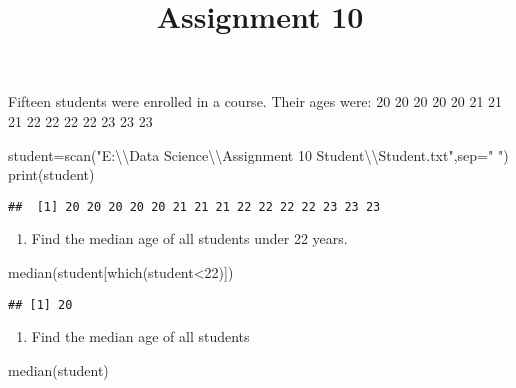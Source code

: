 \documentclass[
]{article}
\title{Assignment 10}
\author{}
\date{\vspace{-2.5em}}
\newenvironment{Shaded}{\begin{snugshade}}{\end{snugshade}}
\newcommand{\AttributeTok}[1]{\textcolor[rgb]{0.77,0.63,0.00}{#1}}
\newcommand{\DecValTok}[1]{\textcolor[rgb]{0.00,0.00,0.81}{#1}}
\newcommand{\FunctionTok}[1]{\textcolor[rgb]{0.00,0.00,0.00}{#1}}
\newcommand{\NormalTok}[1]{#1}
\newcommand{\OtherTok}[1]{\textcolor[rgb]{0.56,0.35,0.01}{#1}}
\newcommand{\SpecialCharTok}[1]{\textcolor[rgb]{0.00,0.00,0.00}{#1}}
\newcommand{\StringTok}[1]{\textcolor[rgb]{0.31,0.60,0.02}{#1}}
\providecommand{\tightlist}{%
  \setlength{\itemsep}{0pt}\setlength{\parskip}{0pt}}
\begin{document}
\maketitle

Fifteen students were enrolled in a course. Their ages were: 20 20 20 20
20 21 21 21 22 22 22 22 23 23 23

\begin{Shaded}
\begin{Highlighting}[]
\NormalTok{student}\OtherTok{=}\FunctionTok{scan}\NormalTok{(}\StringTok{"E:}\SpecialCharTok{\textbackslash{}\textbackslash{}}\StringTok{Data Science}\SpecialCharTok{\textbackslash{}\textbackslash{}}\StringTok{Assignment 10 Student}\SpecialCharTok{\textbackslash{}\textbackslash{}}\StringTok{Student.txt"}\NormalTok{,}\AttributeTok{sep=}\StringTok{" "}\NormalTok{)}
\FunctionTok{print}\NormalTok{(student)}
\end{Highlighting}
\end{Shaded}

\begin{verbatim}
##  [1] 20 20 20 20 20 21 21 21 22 22 22 22 23 23 23
\end{verbatim}

\begin{enumerate}
\def\labelenumi{\roman{enumi})}
\tightlist
\item
  Find the median age of all students under 22 years.
\end{enumerate}

\begin{Shaded}
\begin{Highlighting}[]
\FunctionTok{median}\NormalTok{(student[}\FunctionTok{which}\NormalTok{(student}\SpecialCharTok{\textless{}}\DecValTok{22}\NormalTok{)])}
\end{Highlighting}
\end{Shaded}

\begin{verbatim}
## [1] 20
\end{verbatim}

\begin{enumerate}
\def\labelenumi{\roman{enumi})}
\setcounter{enumi}{1}
\tightlist
\item
  Find the median age of all students
\end{enumerate}

\begin{Shaded}
\begin{Highlighting}[]
\FunctionTok{median}\NormalTok{(student)}
\end{Highlighting}
\end{Shaded}
\end{document}
